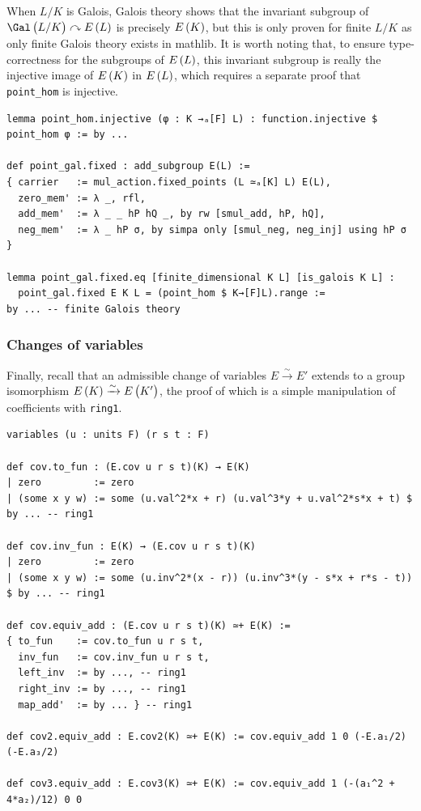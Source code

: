 When $ L / K $ is Galois, Galois theory shows that the invariant subgroup of $ \Gal\br{L / K} \curvearrowright E\br{L} $ is precisely $ E\br{K} $, but this is only proven for finite $ L / K $ as only finite Galois theory exists in mathlib. It is worth noting that, to ensure type-correctness for the subgroups of $ E\br{L} $, this invariant subgroup is really the injective image of $ E\br{K} $ in $ E\br{L} $, which requires a separate proof that \texttt{point\_hom} is injective.

\begin{lstlisting}[frame=single]
lemma point_hom.injective (φ : K →ₐ[F] L) : function.injective $ point_hom φ := by ...

def point_gal.fixed : add_subgroup E(L) :=
{ carrier   := mul_action.fixed_points (L ≃ₐ[K] L) E(L),
  zero_mem' := λ _, rfl,
  add_mem'  := λ _ _ hP hQ _, by rw [smul_add, hP, hQ],
  neg_mem'  := λ _ hP σ, by simpa only [smul_neg, neg_inj] using hP σ }

lemma point_gal.fixed.eq [finite_dimensional K L] [is_galois K L] :
  point_gal.fixed E K L = (point_hom $ K→[F]L).range :=
by ... -- finite Galois theory
\end{lstlisting}

\subsubsection{Changes of variables}

Finally, recall that an admissible change of variables $ E \xrightarrow{\sim} E' $ extends to a group isomorphism $ E\br{K} \xrightarrow{\sim} E\br{K'} $, the proof of which is a simple manipulation of coefficients with \texttt{ring1}.

\begin{lstlisting}[frame=single]
variables (u : units F) (r s t : F)

def cov.to_fun : (E.cov u r s t)(K) → E(K)
| zero         := zero
| (some x y w) := some (u.val^2*x + r) (u.val^3*y + u.val^2*s*x + t) $ by ... -- ring1

def cov.inv_fun : E(K) → (E.cov u r s t)(K)
| zero         := zero
| (some x y w) := some (u.inv^2*(x - r)) (u.inv^3*(y - s*x + r*s - t)) $ by ... -- ring1

def cov.equiv_add : (E.cov u r s t)(K) ≃+ E(K) :=
{ to_fun    := cov.to_fun u r s t,
  inv_fun   := cov.inv_fun u r s t,
  left_inv  := by ..., -- ring1
  right_inv := by ..., -- ring1
  map_add'  := by ... } -- ring1

def cov2.equiv_add : E.cov2(K) ≃+ E(K) := cov.equiv_add 1 0 (-E.a₁/2) (-E.a₃/2)

def cov3.equiv_add : E.cov3(K) ≃+ E(K) := cov.equiv_add 1 (-(a₁^2 + 4*a₂)/12) 0 0
\end{lstlisting}

